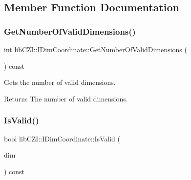 \subsection{Member Function Documentation}
\mbox{\label{classlib_c_z_i_1_1_i_dim_coordinate_af70c2c0edc0ce4cc15de7a5a0b6442bd}} 
\subsubsection{\texorpdfstring{Get\+Number\+Of\+Valid\+Dimensions()}{GetNumberOfValidDimensions()}}
{\footnotesize\ttfamily int lib\+C\+Z\+I\+::\+I\+Dim\+Coordinate\+::\+Get\+Number\+Of\+Valid\+Dimensions (\begin{DoxyParamCaption}{ }\end{DoxyParamCaption}) const\hspace{0.3cm}{\ttfamily [inline]}}

Gets the number of valid dimensions.

\begin{DoxyReturn}{Returns}
The number of valid dimensions. 
\end{DoxyReturn}
\mbox{\label{classlib_c_z_i_1_1_i_dim_coordinate_a92dbe2ec439f6c5c47102c51955039e0}} 
\subsubsection{\texorpdfstring{Is\+Valid()}{IsValid()}}
{\footnotesize\ttfamily bool lib\+C\+Z\+I\+::\+I\+Dim\+Coordinate\+::\+Is\+Valid (\begin{DoxyParamCaption}\item[{\hyperlink{namespacelib_c_z_i_a55049658acf59d0eddfaebcad16df424}{Dimension\+Index}}]{dim }\end{DoxyParamCaption}) const\hspace{0.3cm}{\ttfamily [inline]}}

